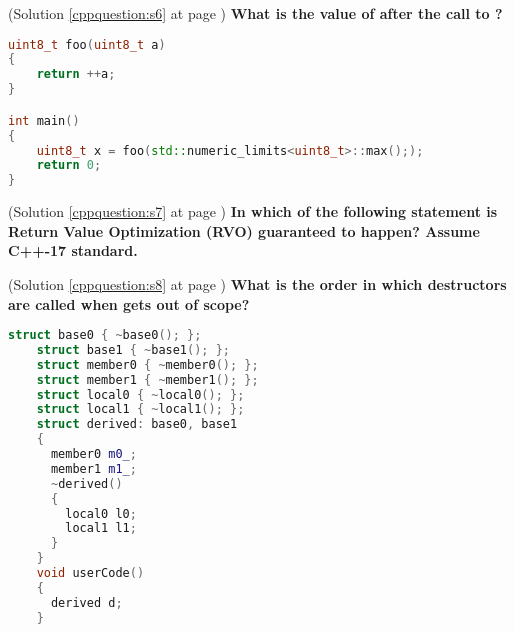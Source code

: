 \begin{cppquestion}
    \label{cppquestion:q6}
    (Solution \ref{cppquestion:s6} at page \pageref{cppquestion:s6})
    \question \textbf{What is the value of  after the call to ?} 
\begin{lstlisting}[language=c++,numbers=none, caption={}]
uint8_t foo(uint8_t a)
{
    return ++a;
}

int main()
{
    uint8_t x = foo(std::numeric_limits<uint8_t>::max(););
    return 0;
}
\end{lstlisting}
    \begin{choices}
     \choice {}
     \choice {}
     \choice {}
     \choice {}
     \choice {}
     \choice {}
     \choice {}
     \choice {}
     \choice {}
    \end{choices}
\end{cppquestion}



\begin{cppquestion}
    \label{cppquestion:q6}
    (Solution \ref{cppquestion:s7} at page \pageref{cppquestion:s7})
    \question \textbf{In which of the following statement is Return Value Optimization (RVO) guaranteed to happen? Assume C++-17 standard.} 
    \begin{choices}
     \choice {}
     \choice {}
     \choice {}
     \choice {}
    \end{choices}
\end{cppquestion}



\begin{cppquestion}
    \label{cppquestion:q8}
    (Solution \ref{cppquestion:s8} at page \pageref{cppquestion:s8})
    \question \textbf{What is the order in which destructors are called when  gets out of scope?} 
\begin{lstlisting}[language=c++,numbers=none, caption={}]
    struct base0 { ~base0(); };
    struct base1 { ~base1(); };
    struct member0 { ~member0(); };
    struct member1 { ~member1(); };
    struct local0 { ~local0(); };
    struct local1 { ~local1(); };
    struct derived: base0, base1
    {
      member0 m0_;
      member1 m1_;
      ~derived()
      {
        local0 l0;
        local1 l1;
      }
    }
    void userCode()
    {
      derived d;
    }                 
\end{lstlisting} 
\end{cppquestion}


